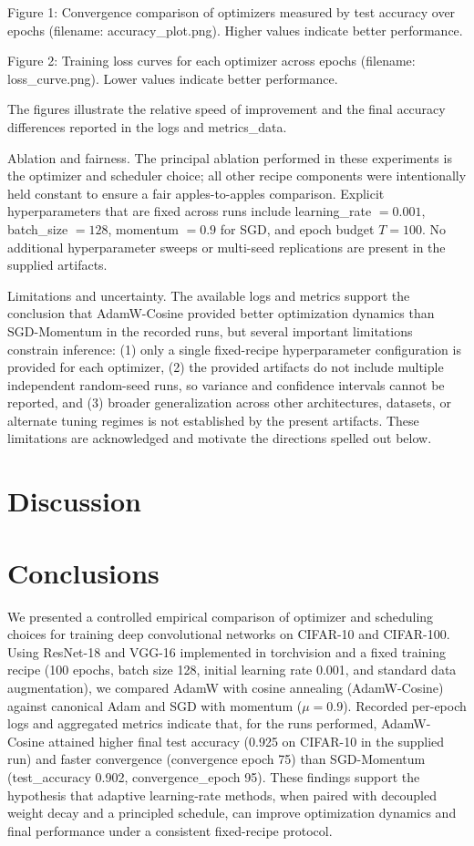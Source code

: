 \documentclass[journal,article,submit,pdftex,moreauthors]{Definitions/mdpi}
\begin{document}
Figure 1: Convergence comparison of optimizers measured by test accuracy over epochs (filename: accuracy\_plot.png). Higher values indicate better performance.

Figure 2: Training loss curves for each optimizer across epochs (filename: loss\_curve.png). Lower values indicate better performance.

The figures illustrate the relative speed of improvement and the final accuracy differences reported in the logs and metrics\_data.

Ablation and fairness. The principal ablation performed in these experiments is the optimizer and scheduler choice; all other recipe components were intentionally held constant to ensure a fair apples-to-apples comparison. Explicit hyperparameters that are fixed across runs include learning\_rate $= 0.001$, batch\_size $= 128$, momentum $= 0.9$ for SGD, and epoch budget $T = 100$. No additional hyperparameter sweeps or multi-seed replications are present in the supplied artifacts.

Limitations and uncertainty. The available logs and metrics support the conclusion that AdamW-Cosine provided better optimization dynamics than SGD-Momentum in the recorded runs, but several important limitations constrain inference: (1) only a single fixed-recipe hyperparameter configuration is provided for each optimizer, (2) the provided artifacts do not include multiple independent random-seed runs, so variance and confidence intervals cannot be reported, and (3) broader generalization across other architectures, datasets, or alternate tuning regimes is not established by the present artifacts. These limitations are acknowledged and motivate the directions spelled out below.

\section{Discussion}



\section{Conclusions}

We presented a controlled empirical comparison of optimizer and scheduling choices for training deep convolutional networks on CIFAR-10 and CIFAR-100. Using ResNet-18 and VGG-16 implemented in torchvision and a fixed training recipe (100 epochs, batch size 128, initial learning rate 0.001, and standard data augmentation), we compared AdamW with cosine annealing (AdamW-Cosine) against canonical Adam and SGD with momentum ($\mu = 0.9$). Recorded per-epoch logs and aggregated metrics indicate that, for the runs performed, AdamW-Cosine attained higher final test accuracy (0.925 on CIFAR-10 in the supplied run) and faster convergence (convergence epoch 75) than SGD-Momentum (test\_accuracy 0.902, convergence\_epoch 95). These findings support the hypothesis that adaptive learning-rate methods, when paired with decoupled weight decay and a principled schedule, can improve optimization dynamics and final performance under a consistent fixed-recipe protocol.
\end{document}

